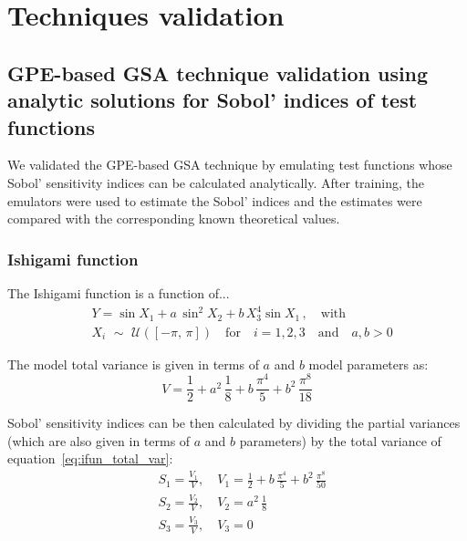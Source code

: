 \chapter{Techniques validation}\label{cha:chapterA}

%
%
%
\section{GPE-based GSA technique validation using analytic solutions for Sobol' indices of test functions}\label{chA:GPE-based_GSA_technique_validation_using_analytic_solutions_for_Sobol'_indices_of_test_functions}
We validated the GPE-based GSA technique by emulating test functions whose Sobol' sensitivity indices can be calculated analytically. After training, the emulators were used to estimate the Sobol' indices and the estimates were compared with the corresponding known theoretical values.

%
%
%
\subsection{Ishigami function}
The Ishigami function is a function of...
%
\begin{align}\label{eq:ishigamifun}
	& Y = \sin{X_1} + a\,\sin^2{X_2} + b\,X_3^4\sin{X_1}\,,\quad\text{with} \\
	& X_i\,\,\sim\,\,\mathcal{U}([-\pi,\,\pi])\quad \text{for}\quad i=1,2,3\quad \text{and}\quad a,b>0
\end{align}

\vspace{0.2cm}\noindent
The model total variance is given in terms of $a$ and $b$ model parameters as:
%
\begin{equation}\label{eq:ifun_total_var}
	V = \frac{1}{2} + a^2\,\frac{1}{8} + b\,\frac{\pi^4}{5} + b^2\,\frac{\pi^8}{18}
\end{equation}

\vspace{0.2cm}\noindent
Sobol' sensitivity indices can be then calculated by dividing the partial variances (which are also given in terms of $a$ and $b$ parameters) by the total variance of equation~\eqref{eq:ifun_total_var}:
%
\begin{align}
	& S_{1} = \frac{V_{1}}{V},\quad V_{1} = \frac{1}{2} + b\,\frac{\pi^4}{5} + b^2\,\frac{\pi^8}{50} \\
	& S_{2} = \frac{V_{2}}{V},\quad V_{2} = a^2\,\frac{1}{8} \\
	& S_{3} = \frac{V_{3}}{V},\quad V_{3} = 0
\end{align}

